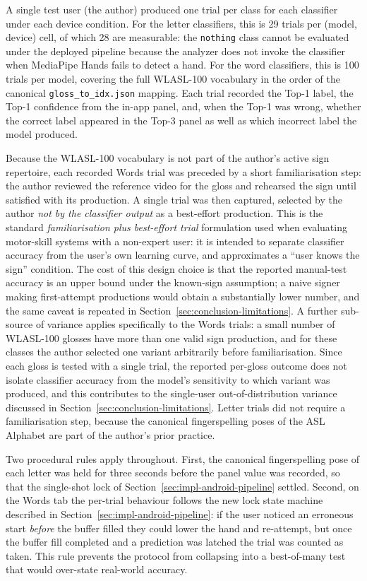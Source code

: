 A single test user (the author) produced one trial per class for
each classifier under each device condition. For the letter
classifiers, this is 29 trials per (model, device) cell, of which 28
are measurable: the \texttt{nothing} class cannot be evaluated under
the deployed pipeline because the analyzer does not invoke the
classifier when MediaPipe Hands fails to detect a hand. For the
word classifiers, this is 100 trials per model, covering the full
WLASL-100 vocabulary in the order of the canonical
\texttt{gloss\_to\_idx.json} mapping. Each trial recorded the Top-1
label, the Top-1 confidence from the in-app panel, and, when the
Top-1 was wrong, whether the correct label appeared in the Top-3
panel as well as which incorrect label the model produced.

Because the WLASL-100 vocabulary is not part of the author's active
sign repertoire, each recorded Words trial was preceded by a short
familiarisation step: the author reviewed the reference video for
the gloss and rehearsed the sign until satisfied with its
production. A single trial was then captured, selected by the author
\emph{not by the classifier output} as a best-effort production.
This is the standard \emph{familiarisation plus best-effort trial}
formulation used when evaluating motor-skill systems with a
non-expert user: it is intended to separate classifier accuracy from
the user's own learning curve, and approximates a ``user knows the
sign'' condition. The cost of this design choice is that the
reported manual-test accuracy is an upper bound under the known-sign
assumption; a naive signer making first-attempt productions would
obtain a substantially lower number, and the same caveat is repeated
in Section~\ref{sec:conclusion-limitations}. A further sub-source of
variance applies specifically to the Words trials: a small number of
WLASL-100 glosses have more than one valid sign production, and for
these classes the author selected one variant arbitrarily before
familiarisation. Since each gloss is tested with a single trial, the
reported per-gloss outcome does not isolate classifier accuracy from
the model's sensitivity to which variant was produced, and this
contributes to the single-user out-of-distribution variance discussed
in Section~\ref{sec:conclusion-limitations}. Letter trials did not
require a familiarisation step, because the canonical fingerspelling
poses of the ASL Alphabet are part of the author's prior practice.

Two procedural rules apply throughout. First, the canonical
fingerspelling pose of each letter was held for three seconds
before the panel value was recorded, so that the single-shot lock
of Section~\ref{sec:impl-android-pipeline} settled. Second, on the
Words tab the per-trial behaviour follows the new lock state
machine described in Section~\ref{sec:impl-android-pipeline}: if
the user noticed an erroneous start \emph{before} the buffer
filled they could lower the hand and re-attempt, but once the
buffer fill completed and a prediction was latched the trial was
counted as taken. This rule prevents the protocol from collapsing
into a best-of-many test that would over-state real-world accuracy.

